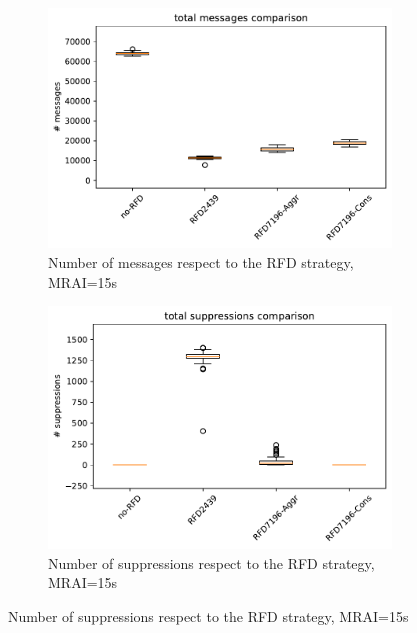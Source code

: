 \begin{figure}[H]
\begin{subfigure}[b]{0.325\textwidth}
         \label{fig:1000_RFD_MRAI30_time_elephant}
     \end{subfigure}
     \hfill
     \begin{subfigure}[b]{0.325\textwidth}
         \centering
         \includegraphics[width=\textwidth]{images/RFD/miceVSelephants/MultiMRAI/15/elephants/cisco_1000MRAI15_rfd_comparison_messages_boxplot.pdf}
         \caption{Number of messages respect to the RFD strategy, MRAI=15s}
         \label{fig:1000_RFD_MRAI30_messages_elephant}
     \end{subfigure}
     \hfill
     \begin{subfigure}[b]{0.325\textwidth}
         \centering
         \includegraphics[width=\textwidth]{images/RFD/miceVSelephants/MultiMRAI/15/elephants/cisco_1000MRAI15_rfd_comparison_suppressions_boxplot.pdf}
         \caption{Number of suppressions respect to the RFD strategy, MRAI=15s}

\end{subfigure}
\end{figure}
